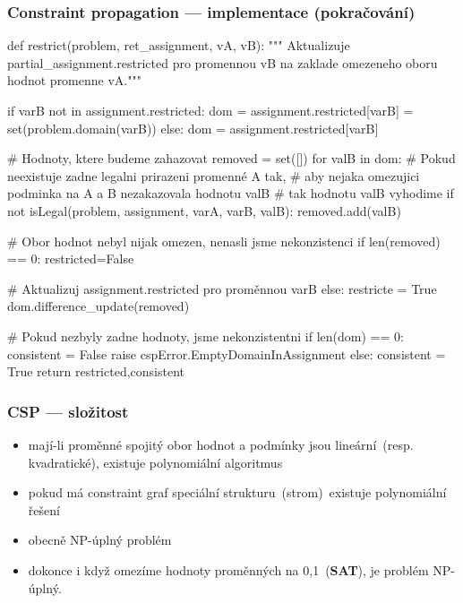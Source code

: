 \documentclass[red,professionalfont]{beamer}
\theoremstyle{definition}
\newcommand{\0}{\mbox{${\bf 0}$}}
\renewcommand{\emph}[1]{{\bf #1}}
\begin{document}
\begin{frame}[fragile]\frametitle{Constraint propagation --- implementace (pokračování)}
\begin{python}[basicstyle=\ttfamily\tiny\setstretch{1}] 
 def restrict(problem, ret_assignment, vA, vB):
 """ Aktualizuje partial_assignment.restricted pro promennou vB
     na zaklade omezeneho oboru hodnot promenne vA."""
\end{python}\pause
\begin{python}[basicstyle=\ttfamily\tiny\setstretch{1}]     
  if varB not in assignment.restricted:
    dom = assignment.restricted[varB] = set(problem.domain(varB))
  else:
    dom = assignment.restricted[varB]
\end{python}\pause
\begin{python}[basicstyle=\ttfamily\tiny\setstretch{1}]  
  # Hodnoty, ktere budeme zahazovat
  removed = set([])
  for valB in dom:
    # Pokud neexistuje zadne legalni prirazeni promenné A tak,
    # aby nejaka omezujici podminka na A a B nezakazovala hodnotu valB
    # tak hodnotu valB vyhodime
    if not isLegal(problem, assignment, varA, varB, valB):
      removed.add(valB)
\end{python}\pause
\begin{python}[basicstyle=\ttfamily\tiny\setstretch{1}]  
  # Obor hodnot nebyl nijak omezen, nenasli jsme nekonzistenci
  if len(removed) == 0:
    restricted=False
 
  # Aktualizuj assignment.restricted pro proměnnou varB
  else:
    restricte = True
    dom.difference_update(removed)
\end{python}\pause
\begin{python}[basicstyle=\ttfamily\tiny\setstretch{1}]  
  # Pokud nezbyly zadne hodnoty, jsme nekonzistentni
  if len(dom) == 0:
    consistent = False
    raise cspError.EmptyDomainInAssignment
  else:
    consistent = True
  return restricted,consistent
\end{python}
\end{frame}


\begin{frame}\frametitle{CSP --- složitost}
\begin{itemize}
 \item mají-li proměnné spojitý obor hodnot a podmínky jsou lineární\pause\ (resp. kvadratické)\pause,
       existuje polynomiální algoritmus\pause
 \item pokud má constraint graf speciální strukturu\pause\ (strom)\pause\ existuje polynomiální řešení\pause
 \item obecně NP-úplný problém\pause
 \item dokonce i když omezíme hodnoty proměnných na 0,1\pause\ (\emph{SAT})\pause, je problém NP-úplný.
\end{itemize}
\end{frame}
\end{document}
